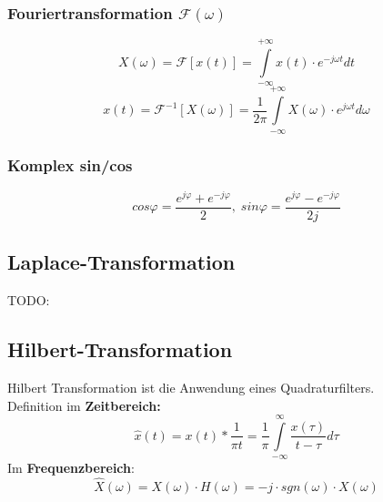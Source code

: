 \subsubsection*{Fouriertransformation $\mathcal{F}(\omega)$}
$$ X(\omega) = \mathcal{F}[x(t)] = \int \limits _{-\infty} ^{+\infty} x(t) \cdot e^{-j \omega t} dt $$
$$ x(t) = \mathcal{F}^{-1}[X(\omega)] = \frac{1}{2 \pi} \int \limits _{- \infty} ^{+ \infty} X(\omega) \cdot e^{j \omega t} d\omega$$

\subsubsection*{Komplex sin/cos}

$$cos \varphi = \frac{e^{j\varphi}+ e^{-j\varphi}}{2}, \; sin \varphi = \frac{e^{j\varphi} - e^{-j\varphi}}{2j} $$

\subsection{Laplace-Transformation}
TODO: %

\subsection{Hilbert-Transformation}
Hilbert Transformation ist die Anwendung eines Quadraturfilters. \\
Definition im \textbf{Zeitbereich:}
$$\hat{x}(t) = x(t) * \frac{1}{\pi t} = \frac{1}{\pi} \int \limits _{-\infty} ^{\infty} \frac{x(\tau)}{t-\tau} d\tau$$
Im \textbf{Frequenzbereich}:
$$\hat{X}(\omega) = X(\omega) \cdot H(\omega) = -j \cdot sgn(\omega) \cdot X(\omega)$$
